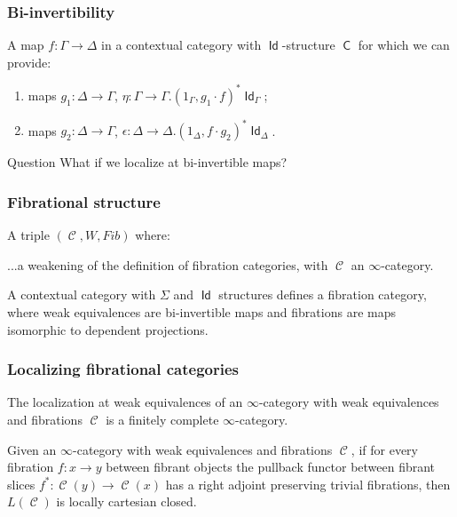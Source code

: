 \documentclass{beamer}
\DeclareMathOperator{\Id}{\mathsf{Id}}
\DeclareMathOperator{\sfC}{\mathsf{C}}
\DeclareMathOperator{\cC}{\mathcal{C}}
\begin{document}
\begin{frame}
  \frametitle{Bi-invertibility}

  \begin{defn}
    A map $f\colon\Gamma\rightarrow\Delta$ in a contextual category with
    $\Id$-structure $\sfC$ for which we can provide:
    \begin{enumerate}
      \item maps $g_1\colon\Delta\rightarrow\Gamma$,
        $\eta\colon\Gamma\rightarrow\Gamma.(1_\Gamma,g_1\cdot f)^*\Id_\Gamma$;
      \item maps $g_2\colon\Delta\rightarrow\Gamma$,
        $\epsilon\colon\Delta\rightarrow\Delta.(1_\Delta,f\cdot g_2)^*\Id_\Delta$.
    \end{enumerate}
  \end{defn}

  \begin{block}{Question}
    What if we localize at bi-invertible maps?
  \end{block}
\end{frame}

\begin{frame}
  \frametitle{Fibrational structure}
  
  \begin{defn}
    A triple $(\cC,W,Fib)$ where:

    ...a weakening of the definition of fibration categories, with $\cC$ an
    $\infty$-category.
  \end{defn}

  \begin{thm}
    A contextual category with $\Sigma$ and $\Id$ structures defines a
    fibration category, where weak
    equivalences are bi-invertible maps and
    fibrations are maps isomorphic to  dependent projections.
  \end{thm}
\end{frame}

\begin{frame}
  \frametitle{Localizing fibrational categories}

  \begin{prop}[Cisinski]
    The localization at weak equivalences of an $\infty$-category with weak
    equivalences and fibrations $\cC$ is a finitely complete $\infty$-category.
  \end{prop}

  \begin{prop}[Cisinski]
    Given an $\infty$-category with weak equivalences and fibrations $\cC$, if
    for every fibration $f\colon x\rightarrow y$ between fibrant objects the
    pullback functor between fibrant slices $f^*\colon\cC(y)\rightarrow\cC(x)$
    has a right adjoint preserving trivial fibrations, then $L(\cC)$ is locally
    cartesian closed.
  \end{prop}
\end{frame}
\end{document}
